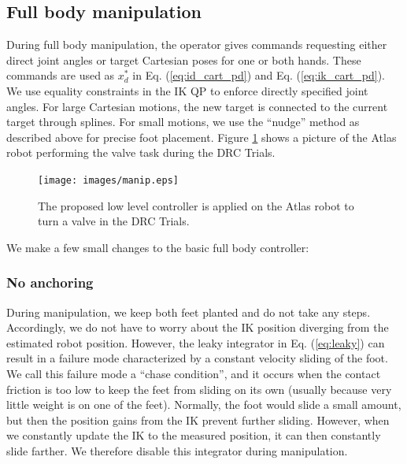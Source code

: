 \documentclass{ws-ijhr}
\newcommand{\eref}[1] {Eq. (\ref{#1})}
\newcommand{\fref}[1] {Figure \ref{#1}}
\begin{document}
\subsection{Full body manipulation}
During full body manipulation, the operator gives commands requesting either 
direct joint angles or target Cartesian poses for one or both hands. 
These commands are used as $x^*_d$ in \eref{eq:id_cart_pd} and \eref{eq:ik_cart_pd}. We use equality 
constraints in the IK QP to enforce 
directly specified joint angles. For large Cartesian motions, the new target is 
connected to the current target through splines. 
For small motions, we use the ``nudge'' method as described above for precise 
foot placement.
\fref{fig:manip} shows a picture of the Atlas robot performing the valve task 
during the DRC Trials.

\begin{figure} 
  \begin{center}
    {\texttt{[image: images/manip.eps]}}
    \caption{The proposed low level controller is applied on the Atlas robot 
      to turn a valve in the DRC Trials.} \label{fig:manip}
  \end{center}
\end{figure}  
 
We make a few small changes to the basic full body controller:
\subsubsection{No anchoring}
During manipulation, we keep both feet planted and do not take any steps. 
Accordingly, we do not have to worry about the IK position diverging from the 
estimated robot position. However, the leaky integrator in \eref{eq:leaky} 
can result in a failure mode characterized by a constant velocity sliding of 
the foot. We call this failure mode a ``chase condition'', and it occurs when 
the contact friction is too low to keep the feet from sliding on its own 
(usually because very little weight is on one of the feet). Normally, the 
foot would slide a small amount, but then the position gains from the IK 
prevent further sliding. However, when we constantly update the IK to the 
measured position, it can then constantly slide farther. We therefore 
disable this integrator during manipulation.
\label{sec:chase_condition}
\end{document}
